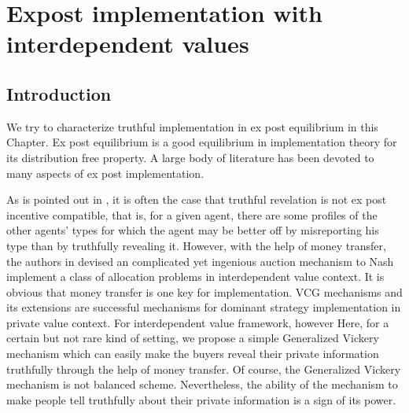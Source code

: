 
\chapter{Expost implementation with  interdependent values}  %

\label{Chapter3} %




\section{Introduction}
 We try to characterize truthful implementation in ex post equilibrium in this Chapter.  Ex post equilibrium 
 is a good equilibrium in implementation theory for its distribution free property. A large body of literature has been devoted to 
 many aspects of ex post implementation. 

 

 As is pointed out in \parencite{Postlewaite2014}, it is often the case that truthful revelation is not ex post incentive compatible, that is, for a given 
 agent, there are some profiles of the other agents' types for which the agent may be better off by misreporting his type than by 
 truthfully revealing it. However, with the help of money transfer, the authors in \parencite{Maskin00} devised an complicated yet ingenious 
 auction mechanism to Nash implement a class of allocation problems in interdependent value context. It is obvious 
 that money transfer is one key for implementation. 
VCG mechanisms and its extensions are successful mechanisms for dominant strategy implementation in private value context. For interdependent value framework, however
 Here, for a certain but not rare kind of setting, we propose a simple Generalized Vickery mechanism which can easily make the buyers
 reveal their private information truthfully through the help of money transfer. Of course, the Generalized Vickery mechanism is not 
 balanced scheme. Nevertheless, the ability of the mechanism to make people tell truthfully about their private information is a sign of 
 its power.   

